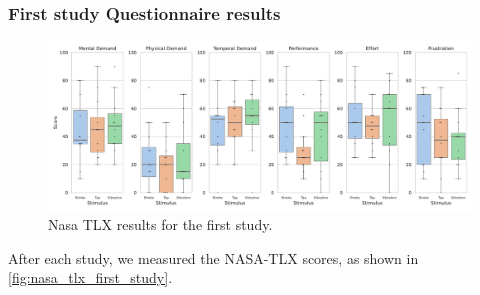 \subsubsection{First study Questionnaire results}


\begin{figure}
    \centering
    \includegraphics[width=0.5\linewidth]{src/pictures/Study1Data_questionnaire/NasaTLX_study1.pdf}
    \caption{Nasa TLX results for the first study.}
    \label{fig:nasa_tlx_first_study}
\end{figure}





After each study, we measured the NASA-TLX scores, as shown in \autoref{fig:nasa_tlx_first_study}.

